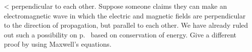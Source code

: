 <%
perpendicular to each other.
Suppose someone claims they can make an electromagnetic wave in which the electric
and magnetic fields are perpendicular to the direction of propagation, but parallel to each other.
We have already ruled out such a possibility on p.~\pageref{subsec:e-b-perp} based on conservation of energy.
Give a different proof by using Maxwell's equations.
